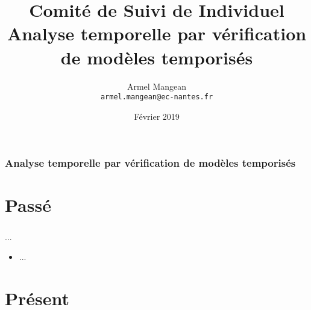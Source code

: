 \documentclass{beamer}
\title{%
  Comité de Suivi de Individuel \\
  {\bf Analyse temporelle par vérification de modèles temporisés}}
\author{%
  Armel Mangean \\
  {\small\tt armel.mangean@ec-nantes.fr}}
\institute{%
  École Centrale de Nantes}
\date{Février 2019}
\begin{document}
  \begin{frame}
    \small
    \titlepage
  \end{frame}

  \begin{frame}
    \frametitle{Analyse temporelle par vérification de modèles temporisés}
    \tableofcontents%
  \end{frame}


  \section{Passé}


  \begin{frame}
    \frametitle{\secname}
    \vfill

    ...
    \begin{itemize}
      \item ...
    \end{itemize}


    \vfill
  \end{frame}


  \section{Présent}

\end{document}
